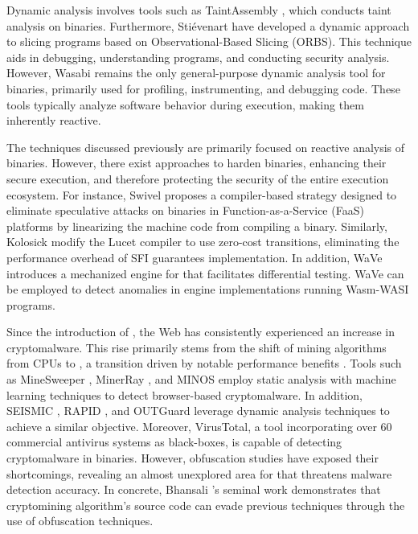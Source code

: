  Dynamic analysis involves tools such as TaintAssembly \cite{taintassembly}, which conducts taint analysis on \Wasm binaries. 
Furthermore, Stiévenart \etal have developed a dynamic approach to slicing \Wasm programs based on Observational-Based Slicing (ORBS)\cite{slicing, slicing2}.
This technique aids in debugging, understanding programs, and conducting security analysis.
However, Wasabi \cite{wasabi} remains the only general-purpose dynamic analysis tool for \Wasm binaries, primarily used for profiling, instrumenting, and debugging \Wasm code. 
These tools typically analyze software behavior during execution, making them inherently reactive. 

The techniques discussed previously are primarily focused on reactive analysis of \Wasm binaries.
However, there exist approaches to harden \Wasm binaries, enhancing their secure execution, and therefore protecting the security of the entire execution ecosystem. 
For instance, Swivel \cite{Swivel} proposes a compiler-based strategy designed to eliminate speculative attacks on \Wasm binaries in Function-as-a-Service (FaaS) platforms by linearizing the machine code from compiling a \Wasm binary. 
Similarly, Kolosick \etal \cite{10.1145/3498688} modify the Lucet compiler to use zero-cost transitions, eliminating the performance overhead of SFI guarantees implementation.
In addition, WaVe \cite{wave} introduces a mechanized engine for \Wasm that facilitates differential testing. 
WaVe can be employed to detect anomalies in engine implementations running Wasm-WASI programs. 



 Since the introduction of \Wasm, the Web has consistently experienced an increase in cryptomalware. 
This rise primarily stems from the shift of mining algorithms from CPUs to \Wasm, a transition driven by notable performance benefits \cite{musch2019new}.
Tools such as MineSweeper \cite{Minesweeper}, MinerRay \cite{MinerRay}, and MINOS \cite{MINOS} employ static analysis with machine learning techniques to detect browser-based cryptomalware.
In addition, SEISMIC \cite{SEISMIC}, RAPID \cite{RAPID}, and OUTGuard \cite{Outguard} leverage dynamic analysis techniques to achieve a similar objective.
Moreover, VirusTotal, a tool incorporating over 60 commercial antivirus systems as black-boxes, is capable of detecting cryptomalware in \Wasm binaries.
However, obfuscation studies have exposed their shortcomings, revealing an almost unexplored area for \Wasm that threatens malware detection accuracy.
In concrete, Bhansali \etal's seminal work \cite{10.1145/3507657.3528560} demonstrates that cryptomining algorithm's source code can evade previous techniques through the use of obfuscation techniques.



